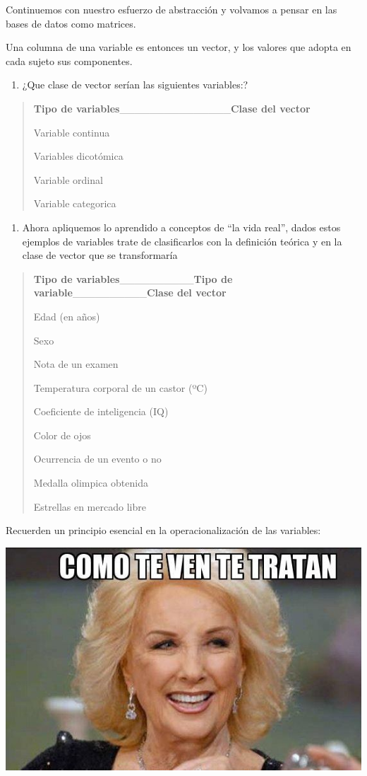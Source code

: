 \documentclass[
]{book}
\providecommand{\tightlist}{%
  \setlength{\itemsep}{0pt}\setlength{\parskip}{0pt}}
\begin{document}
Continuemos con nuestro esfuerzo de abstracción y volvamos a pensar en las bases de datos como matrices.

Una columna de una variable es entonces un vector, y los valores que adopta en cada sujeto sus componentes.

\begin{enumerate}
\def\labelenumi{\arabic{enumi}.}
\tightlist
\item
  ¿Que clase de vector serían las siguientes variables:?
\end{enumerate}

\begin{quote}
\textbf{Tipo de variables}\_\_\_\_\_\_\_\_\_\_\_\_\_\_\_\textbf{Clase del vector}

Variable continua

Variables dicotómica

Variable ordinal

Variable categorica
\end{quote}

\begin{enumerate}
\def\labelenumi{\arabic{enumi}.}
\setcounter{enumi}{1}
\tightlist
\item
  Ahora apliquemos lo aprendido a conceptos de ``la vida real'', dados estos ejemplos de variables trate de clasificarlos con la definición teórica y en la clase de vector que se transformaría
\end{enumerate}

\begin{quote}
\textbf{Tipo de variables}\_\_\_\_\_\_\_\_\_\_\textbf{Tipo de variable}\_\_\_\_\_\_\_\_\_\_\textbf{Clase del vector}

Edad (en años)

Sexo

Nota de un examen

Temperatura corporal de un castor (ºC)

Coeficiente de inteligencia (IQ)

Color de ojos

Ocurrencia de un evento o no

Medalla olimpica obtenida

Estrellas en mercado libre
\end{quote}

Recuerden un principio esencial en la operacionalización de las variables:

\includegraphics[width=7.71in]{img/chiquita}
\end{document}
